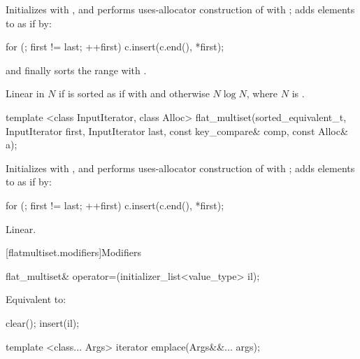 \begin{codeblock}
\begin{codeblock}
\begin{codeblock}
\begin{addedblock}
\begin{itemdescr}
\pnum
\effects Initializes  with , and performs
uses-allocator construction of 
with ; adds elements to  as if by:
\begin{codeblock}
for (; first != last; ++first) {
  c.insert(c.end(), *first);
}
\end{codeblock}
and finally sorts the range  with .

\pnum
\complexity
Linear in $N$ if  is sorted as if with  and
otherwise $N \log N$, where $N$ is .
\end{itemdescr}

%
\begin{itemdecl}
template <class InputIterator, class Alloc>
  flat_multiset(sorted_equivalent_t, InputIterator first, InputIterator last,
                const key_compare& comp, const Alloc& a);
\end{itemdecl}

\begin{itemdescr}
\pnum
\effects Initializes  with , and performs
uses-allocator construction of 
with ; adds elements to  as if by:
\begin{codeblock}
for (; first != last; ++first) {
  c.insert(c.end(), *first);
}
\end{codeblock}

\pnum
\complexity
Linear.
\end{itemdescr}

[flatmultiset.modifiers]{Modifiers}

%
\begin{itemdecl}
flat_multiset& operator=(initializer_list<value_type> il);
\end{itemdecl}

\begin{itemdescr}
\pnum
\effects Equivalent to:
\begin{codeblock}
clear();
insert(il);
\end{codeblock}
\end{itemdescr}

%
\begin{itemdecl}
template <class... Args> iterator emplace(Args&&... args);
\end{itemdecl}


\end{addedblock}
\end{codeblock}
\end{codeblock}
\end{codeblock}
